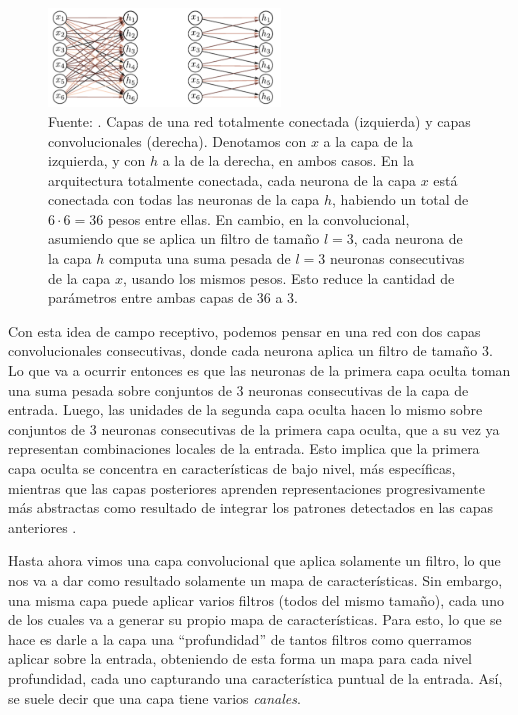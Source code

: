 \documentclass[../../main.tex]{subfiles}
\begin{document}
\begin{figure}
    \centering
    \includegraphics[width=0.55\textwidth]{figs/fully-connected-vs-conv.png}
    \caption{Fuente: \cite{prince2024understanding}. Capas de una red totalmente conectada
    (izquierda) y capas convolucionales (derecha). Denotamos con \(x\) a la capa de la
    izquierda, y con \(h\) a la de la derecha, en ambos casos. En la arquitectura
    totalmente conectada, cada neurona de la capa \(x\) está conectada con todas las
    neuronas de la capa \(h\), habiendo un total de \(6 \cdot 6 = 36\) pesos entre ellas.
    En cambio, en la convolucional, asumiendo que se aplica un filtro de tamaño \(l=3\),
    cada neurona de la capa \(h\) computa una suma pesada de \(l=3\) neuronas consecutivas
    de la capa \(x\), usando los mismos pesos. Esto reduce la cantidad de parámetros entre
    ambas capas de 36 a 3.}
    \label{fig:fully-connected-vs-conv}
\end{figure}

Con esta idea de campo receptivo, podemos pensar en una red con dos capas convolucionales
consecutivas, donde cada neurona aplica un filtro de tamaño 3. Lo que va a ocurrir
entonces es que las neuronas de la primera capa oculta toman una suma pesada sobre
conjuntos de 3 neuronas consecutivas de la capa de entrada. Luego, las unidades de la
segunda capa oculta hacen lo mismo sobre conjuntos de 3 neuronas consecutivas de la
primera capa oculta, que a su vez ya representan combinaciones locales de la entrada. Esto
implica que la primera capa oculta se concentra en características de bajo nivel, más
específicas, mientras que las capas posteriores aprenden representaciones progresivamente
más abstractas como resultado de integrar los patrones detectados en las capas anteriores
\cite{hands-on-ML-sklearn-tf}.

Hasta ahora vimos una capa convolucional que aplica solamente un filtro, lo que nos va a
dar como resultado solamente un mapa de características. Sin embargo, una misma capa puede
aplicar varios filtros (todos del mismo tamaño), cada uno de los cuales va a generar su
propio mapa de características. Para esto, lo que se hace es darle a la capa una
``profundidad'' de tantos filtros como querramos aplicar sobre la entrada, obteniendo de
esta forma un mapa para cada nivel profundidad, cada uno capturando una característica
puntual de la entrada. Así, se suele decir que una capa tiene varios \textit{canales}.
\end{document}
